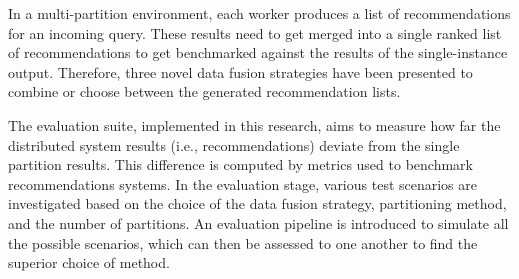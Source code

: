 In a multi-partition environment, each worker produces a list of recommendations for an incoming query. These results need to get merged into a single ranked list of recommendations to get benchmarked against the results of the single-instance output. Therefore, three novel data fusion strategies have been presented to combine or choose between the generated recommendation lists.


The evaluation suite, implemented in this research, aims to measure how far the distributed system results (i.e., recommendations) deviate from the single partition results. This difference is computed by metrics used to benchmark recommendations systems. In the evaluation stage, various test scenarios are investigated based on the choice of the data fusion strategy, partitioning method, and the number of partitions. An evaluation pipeline is introduced to simulate all the possible scenarios, which can then be assessed to one another to find the superior choice of method.
